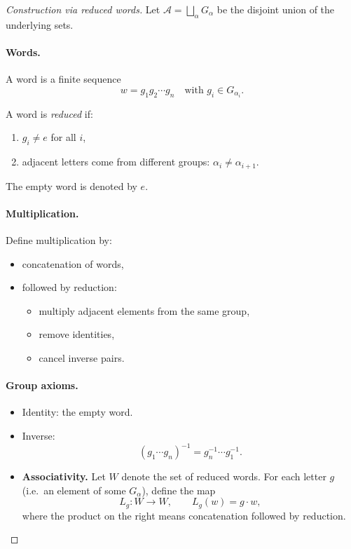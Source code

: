\documentclass[11pt,a4paper]{article}
\theoremstyle{definition}
\theoremstyle{plain}
\theoremstyle{remark}
\newcommand{\1}{\mathbbm{1}}
\begin{document}
\begin{proof}[Construction via reduced words]

Let $\mathcal A=\bigsqcup_\alpha G_\alpha$ be the disjoint union
of the underlying sets.

\paragraph{Words.}
A word is a finite sequence
\[
w=g_1 g_2 \cdots g_n
\quad \text{with } g_i\in G_{\alpha_i}.
\]

A word is \emph{reduced} if:

\begin{enumerate}
\item $g_i \neq e$ for all $i$,
\item adjacent letters come from different groups:
      $\alpha_i \neq \alpha_{i+1}$.
\end{enumerate}

The empty word is denoted by $e$.

\paragraph{Multiplication.}
Define multiplication by:

\begin{itemize}
\item concatenation of words,
\item followed by reduction:
      \begin{itemize}
      \item multiply adjacent elements from the same group,
      \item remove identities,
      \item cancel inverse pairs.
      \end{itemize}
\end{itemize}

\paragraph{Group axioms.}

\begin{itemize}
\item Identity: the empty word.
\item Inverse:
\[
(g_1\cdots g_n)^{-1}=g_n^{-1}\cdots g_1^{-1}.
\]
\item \textbf{Associativity.}
    Let $W$ denote the set of reduced words. For each letter $g$ (i.e.\ an element
    of some $G_\alpha$), define the map
    \[
    L_g : W \to W, \qquad L_g(w) = g \cdot w,
    \]
    where the product on the right means concatenation followed by reduction.


\end{itemize}
\end{proof}
\end{document}
